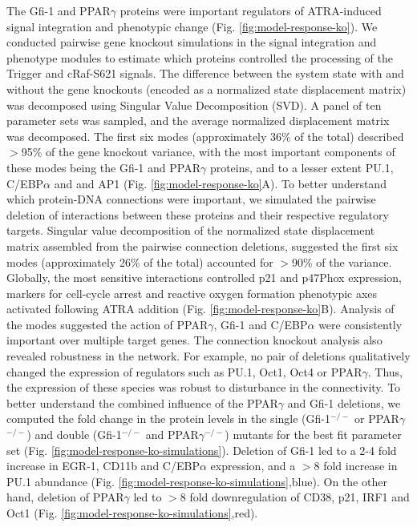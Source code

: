 \documentclass[12pt]{article}
\begin{document}
The Gfi-1 and PPAR$\gamma$ proteins were important regulators of ATRA-induced signal integration and phenotypic change (Fig. \ref{fig:model-response-ko}).
We conducted pairwise gene knockout simulations in the signal integration and phenotype modules to estimate which proteins
controlled the processing of the Trigger and cRaf-S621 signals.
The difference between the system state with and without the gene knockouts (encoded as a normalized state displacement matrix) was decomposed using Singular Value Decomposition (SVD).
A panel of ten parameter sets was sampled, and the average normalized displacement matrix was decomposed.
The first six modes (approximately 36\% of the total) described $>$95\% of the gene knockout variance,
with the most important components of these modes being the Gfi-1 and PPAR$\gamma$ proteins, and to a lesser extent PU.1, C/EBP$\alpha$ and and AP1 (Fig. \ref{fig:model-response-ko}A).
To better understand which protein-DNA connections were important, we simulated the pairwise deletion of interactions between these proteins and their respective regulatory targets.
Singular value decomposition of the normalized state displacement matrix assembled from the pairwise connection deletions, suggested the first six modes (approximately 26\% of the total) accounted for $>$90\% of the variance.
Globally, the most sensitive interactions controlled p21 and p47Phox expression, markers for cell-cycle arrest and reactive oxygen formation phenotypic axes activated following ATRA addition (Fig. \ref{fig:model-response-ko}B).
Analysis of the modes suggested the action of PPAR$\gamma$, Gfi-1 and C/EBP$\alpha$ were consistently important over multiple target genes.
The connection knockout analysis also revealed robustness in the network.
For example, no pair of deletions qualitatively changed the expression of regulators such as PU.1, Oct1, Oct4 or PPAR$\gamma$.
Thus, the expression of these species was robust to disturbance in the connectivity.
To better understand the combined influence of the PPAR$\gamma$ and Gfi-1 deletions, we computed the fold change in the protein levels in the
single (Gfi-1$^{-/-}$ or PPAR$\gamma$$^{-/-}$) and double (Gfi-1$^{-/-}$ and PPAR$\gamma$$^{-/-}$) mutants for the best fit parameter set (Fig. \ref{fig:model-response-ko-simulations}).
Deletion of Gfi-1 led to a 2-4 fold increase in EGR-1, CD11b and C/EBP$\alpha$ expression, and a $>$8 fold increase in PU.1 abundance (Fig. \ref{fig:model-response-ko-simulations},blue).
On the other hand, deletion of PPAR$\gamma$ led to $>$8 fold downregulation of CD38, p21, IRF1 and Oct1 (Fig. \ref{fig:model-response-ko-simulations},red).
\end{document}
